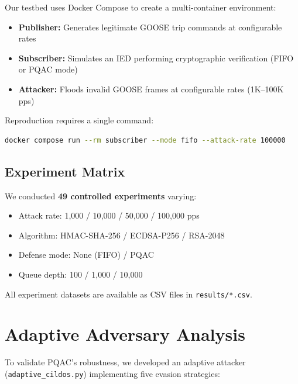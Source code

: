 \documentclass[11pt,a4paper]{article}
\begin{document}
Our testbed uses Docker Compose to create a multi-container environment:

\begin{itemize}[leftmargin=2em]
    \item \textbf{Publisher:} Generates legitimate GOOSE trip commands at configurable rates
    \item \textbf{Subscriber:} Simulates an IED performing cryptographic verification (FIFO or PQAC mode)
    \item \textbf{Attacker:} Floods invalid GOOSE frames at configurable rates (1K--100K\,pps)
\end{itemize}

Reproduction requires a single command:
\begin{lstlisting}[language=bash]
docker compose run --rm subscriber --mode fifo --attack-rate 100000
\end{lstlisting}

\subsection{Experiment Matrix}

We conducted \textbf{49 controlled experiments} varying:
\begin{itemize}[leftmargin=2em]
    \item Attack rate: 1{,}000 / 10{,}000 / 50{,}000 / 100{,}000 pps
    \item Algorithm: HMAC-SHA-256 / ECDSA-P256 / RSA-2048
    \item Defense mode: None (FIFO) / PQAC
    \item Queue depth: 100 / 1{,}000 / 10{,}000
\end{itemize}

All experiment datasets are available as CSV files in \texttt{results/*.csv}.

\section{Adaptive Adversary Analysis}

To validate PQAC's robustness, we developed an adaptive attacker (\texttt{adaptive\_cildos.py}) implementing five evasion strategies:
\end{document}
